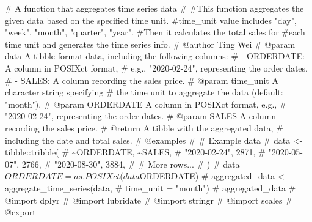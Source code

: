 \documentclass[
  11pt,
]{article}
\newenvironment{Shaded}{\begin{snugshade}}{\end{snugshade}}
\newcommand{\CommentTok}[1]{\textcolor[rgb]{0.37,0.37,0.37}{#1}}
\begin{document}
\begin{Shaded}
\begin{Highlighting}[]
\CommentTok{\#\textquotesingle{} A function that aggregates time series data}
\CommentTok{\#\textquotesingle{}}
\CommentTok{\#\textquotesingle{}This function aggregates the given data based on the specified time unit.}
\CommentTok{\#\textquotesingle{}time\_unit value includes "day", "week", "month", "quarter", "year".}
\CommentTok{\#\textquotesingle{}Then it calculates the total sales for}
\CommentTok{\#\textquotesingle{}each time unit and generates the time series info.}
\CommentTok{\#\textquotesingle{} @author Ting Wei}
\CommentTok{\#\textquotesingle{} @param data A tibble format data, including the following columns:}
\CommentTok{\#\textquotesingle{}   {-} ORDERDATE: A column in POSIXct format,}
\CommentTok{\#\textquotesingle{}   e.g., "2020{-}02{-}24", representing the order dates.}
\CommentTok{\#\textquotesingle{}   {-} SALES: A column recording the sales price.}
\CommentTok{\#\textquotesingle{} @param time\_unit A character string specifying}
\CommentTok{\#\textquotesingle{} the time unit to aggregate the data (default: "month").}
\CommentTok{\#\textquotesingle{} @param ORDERDATE A column in POSIXct format, e.g.,}
\CommentTok{\#\textquotesingle{}  "2020{-}02{-}24", representing the order dates.}
\CommentTok{\#\textquotesingle{} @param SALES A column recording the sales price.}
\CommentTok{\#\textquotesingle{} @return A tibble with the aggregated data,}
\CommentTok{\#\textquotesingle{} including the date and total sales.}
\CommentTok{\#\textquotesingle{} @examples}
\CommentTok{\#\textquotesingle{} \# Example data}
\CommentTok{\#\textquotesingle{} data \textless{}{-} tibble::tribble(}
\CommentTok{\#\textquotesingle{}   \textasciitilde{}ORDERDATE, \textasciitilde{}SALES,}
\CommentTok{\#\textquotesingle{}   "2020{-}02{-}24", 2871,}
\CommentTok{\#\textquotesingle{}   "2020{-}05{-}07", 2766,}
\CommentTok{\#\textquotesingle{}   "2020{-}08{-}30", 3884,}
\CommentTok{\#\textquotesingle{}   \# More rows...}
\CommentTok{\#\textquotesingle{} )}
\CommentTok{\#\textquotesingle{} data$ORDERDATE=as.POSIXct(data$ORDERDATE)}
\CommentTok{\#\textquotesingle{} aggregated\_data \textless{}{-} aggregate\_time\_series(data,}
\CommentTok{\#\textquotesingle{}                                          time\_unit = "month")}
\CommentTok{\#\textquotesingle{} aggregated\_data}
\CommentTok{\#\textquotesingle{} @import dplyr}
\CommentTok{\#\textquotesingle{} @import lubridate}
\CommentTok{\#\textquotesingle{} @import stringr}
\CommentTok{\#\textquotesingle{} @import scales}
\CommentTok{\#\textquotesingle{} @export}


\end{Highlighting}
\end{Shaded}
\end{document}
